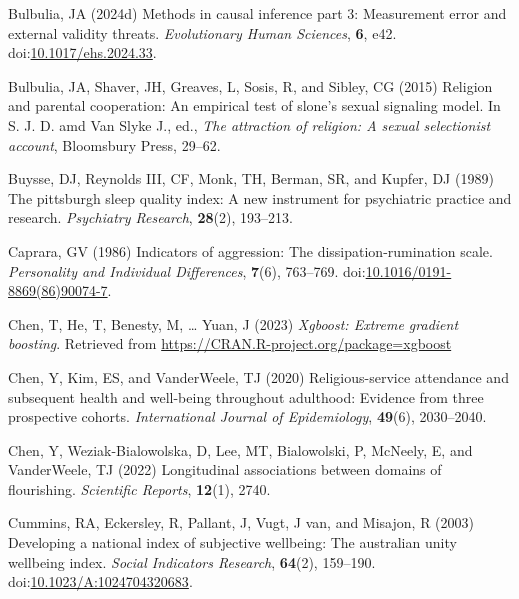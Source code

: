 \documentclass[
  single column]{article}
\newlength{\cslhangindent}
\newenvironment{CSLReferences}[2] %
 {\begin{list}{}{%
  \setlength{\itemindent}{0pt}
  \setlength{\leftmargin}{0pt}
  \setlength{\parsep}{0pt}
  \ifodd #1
   \setlength{\leftmargin}{\cslhangindent}
   \setlength{\itemindent}{-1\cslhangindent}
  \fi
  \setlength{\itemsep}{#2\baselineskip}}}
 {\end{list}}
\begin{document}
\begin{CSLReferences}{1}{0}
Bulbulia, JA (2024d) Methods in causal inference part 3: Measurement
error and external validity threats. \emph{Evolutionary Human Sciences},
\textbf{6}, e42.
doi:\href{https://doi.org/10.1017/ehs.2024.33}{10.1017/ehs.2024.33}.

Bulbulia, JA, Shaver, JH, Greaves, L, Sosis, R, and Sibley, CG (2015)
Religion and parental cooperation: An empirical test of slone's sexual
signaling model. In S. J. D. amd Van Slyke J., ed., \emph{The attraction
of religion: A sexual selectionist account}, Bloomsbury Press, 29--62.

Buysse, DJ, Reynolds III, CF, Monk, TH, Berman, SR, and Kupfer, DJ
(1989) The pittsburgh sleep quality index: A new instrument for
psychiatric practice and research. \emph{Psychiatry Research},
\textbf{28}(2), 193--213.

Caprara, GV (1986) Indicators of aggression: The dissipation-rumination
scale. \emph{Personality and Individual Differences}, \textbf{7}(6),
763--769.
doi:\href{https://doi.org/10.1016/0191-8869(86)90074-7}{10.1016/0191-8869(86)90074-7}.

Chen, T, He, T, Benesty, M, \ldots{} Yuan, J (2023) \emph{Xgboost:
Extreme gradient boosting}. Retrieved from
\url{https://CRAN.R-project.org/package=xgboost}

Chen, Y, Kim, ES, and VanderWeele, TJ (2020) Religious-service
attendance and subsequent health and well-being throughout adulthood:
Evidence from three prospective cohorts. \emph{International Journal of
Epidemiology}, \textbf{49}(6), 2030--2040.

Chen, Y, Weziak-Bialowolska, D, Lee, MT, Bialowolski, P, McNeely, E, and
VanderWeele, TJ (2022) Longitudinal associations between domains of
flourishing. \emph{Scientific Reports}, \textbf{12}(1), 2740.

Cummins, RA, Eckersley, R, Pallant, J, Vugt, J van, and Misajon, R
(2003) Developing a national index of subjective wellbeing: The
australian unity wellbeing index. \emph{Social Indicators Research},
\textbf{64}(2), 159--190.
doi:\href{https://doi.org/10.1023/A:1024704320683}{10.1023/A:1024704320683}.


\end{CSLReferences}
\end{document}
